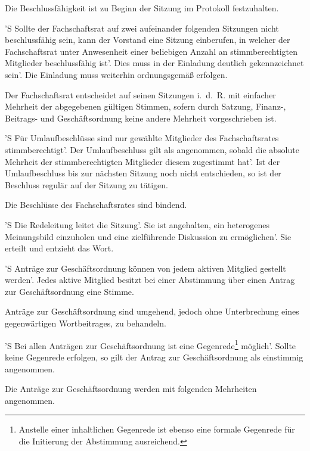 \documentclass[%
	parskip=half,
]{scrartcl}
\newcommand{\edit}[1]{{\color{red} #1}}
\newcommand{\add}[1]{{\color{blue} #1}}
\newcommand{\new}[1]{{\color{orange} #1}}
\begin{document}
\begin{contract}
Die Beschlussfähigkeit ist zu Beginn der Sitzung \add{im Protokoll} festzuhalten.

'S Sollte der Fachschaftsrat auf zwei aufeinander folgenden Sitzungen nicht beschlussfähig sein, \edit{kann der 
Vorstand} eine Sitzung einberufen, in welcher der Fachschaftsrat unter Anwesenheit einer beliebigen Anzahl an 
stimmberechtigten Mitglieder beschlussfähig ist'. Dies muss in der Einladung deutlich gekennzeichnet sein'. Die 
Einladung muss weiterhin ordnungsgemäß erfolgen.

Der Fachschaftsrat entscheidet auf seinen Sitzungen i.~d.~R. mit einfacher Mehrheit der abgegebenen gültigen Stimmen, 
sofern durch Satzung, Finanz-, Beitrags- und Geschäftsordnung keine andere Mehrheit vorgeschrieben ist.

'S Für Umlaufbeschlüsse sind nur gewählte Mitglieder des Fachschaftsrates stimmberechtigt'. Der Umlaufbeschluss gilt 
als angenommen, sobald die absolute Mehrheit \add{der stimmberechtigten Mitglieder} diesem zugestimmt hat'. Ist der 
Umlaufbeschluss bis zur nächsten Sitzung noch nicht entschieden, so ist der Beschluss regulär auf der Sitzung zu 
tätigen.

Die Beschlüsse des Fachschaftsrates sind bindend.

\Clause{title={\edit{Redeleitung}}}

'S Die \edit{Redeleitung} leitet die Sitzung'. Sie ist angehalten, ein heterogenes Meinungsbild einzuholen und eine 
zielführende Diskussion zu ermöglichen'. Sie erteilt und entzieht das Wort.


\add{'S Anträge zur Geschäftsordnung können von jedem \new{aktiven} Mitglied gestellt werden'. Jedes \new{aktive} 
Mitglied besitzt bei einer Abstimmung über einen Antrag zur Geschäftsordnung eine Stimme.}

Anträge zur Geschäftsordnung sind umgehend, jedoch ohne \edit{Unterbrechung eines gegenwärtigen Wortbeitrages}, zu 
behandeln.

'S Bei allen Anträgen zur Geschäftsordnung ist eine Gegenrede\footnote{\add{Anstelle einer inhaltlichen Gegenrede 
ist ebenso eine formale Gegenrede für die Initierung der Abstimmung ausreichend.}} möglich'. Sollte keine Gegenrede 
erfolgen, so gilt der Antrag zur Geschäftsordnung als einstimmig angenommen.

Die Anträge zur Geschäftsordnung werden mit folgenden Mehrheiten angenommen.



\end{contract}
\end{document}
